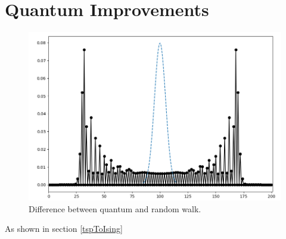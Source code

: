 
\section{Quantum Improvements}
	\begin{figure}[h]
		\begin{center}
			\includegraphics[width=15cm]{images/afunc2}
		\end{center}
		\label{fig:quantumWalk}\caption{Difference between quantum and random walk.}
	\end{figure}
As shown in section \ref{tspToIsing}